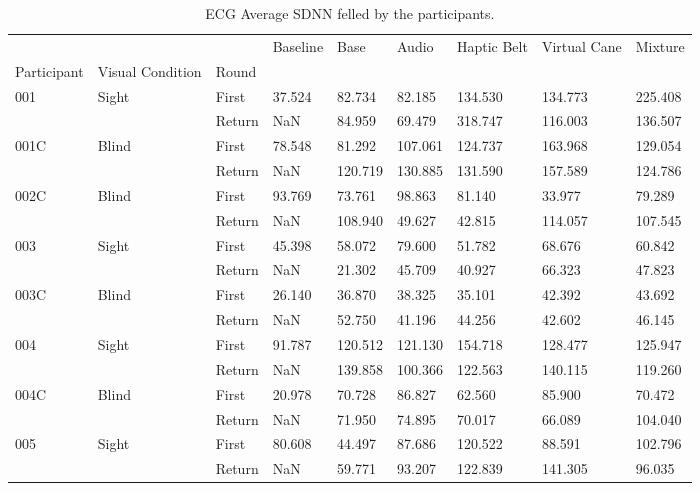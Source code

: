 
\begin{table}[!htb]
\centering
\caption{ECG Average SDNN felled by the participants.}
\label{tab:ecg_sdnn_table}
\begin{tabular}{lllllllll}
\toprule
    &       &        &  Baseline &    Base &   Audio &  Haptic Belt &  Virtual Cane &  Mixture \\
Participant & Visual Condition & Round &           &         &         &              &               &          \\
\midrule
001 & Sight & First &    37.524 &  82.734 &  82.185 &      134.530 &       134.773 &  225.408 \\
    &       & Return &       NaN &  84.959 &  69.479 &      318.747 &       116.003 &  136.507 \\
001C & Blind & First &    78.548 &  81.292 & 107.061 &      124.737 &       163.968 &  129.054 \\
    &       & Return &       NaN & 120.719 & 130.885 &      131.590 &       157.589 &  124.786 \\
002C & Blind & First &    93.769 &  73.761 &  98.863 &       81.140 &        33.977 &   79.289 \\
    &       & Return &       NaN & 108.940 &  49.627 &       42.815 &       114.057 &  107.545 \\
003 & Sight & First &    45.398 &  58.072 &  79.600 &       51.782 &        68.676 &   60.842 \\
    &       & Return &       NaN &  21.302 &  45.709 &       40.927 &        66.323 &   47.823 \\
003C & Blind & First &    26.140 &  36.870 &  38.325 &       35.101 &        42.392 &   43.692 \\
    &       & Return &       NaN &  52.750 &  41.196 &       44.256 &        42.602 &   46.145 \\
004 & Sight & First &    91.787 & 120.512 & 121.130 &      154.718 &       128.477 &  125.947 \\
    &       & Return &       NaN & 139.858 & 100.366 &      122.563 &       140.115 &  119.260 \\
004C & Blind & First &    20.978 &  70.728 &  86.827 &       62.560 &        85.900 &   70.472 \\
    &       & Return &       NaN &  71.950 &  74.895 &       70.017 &        66.089 &  104.040 \\
005 & Sight & First &    80.608 &  44.497 &  87.686 &      120.522 &        88.591 &  102.796 \\
    &       & Return &       NaN &  59.771 &  93.207 &      122.839 &       141.305 &   96.035 \\
\bottomrule
\end{tabular}
\end{table}


